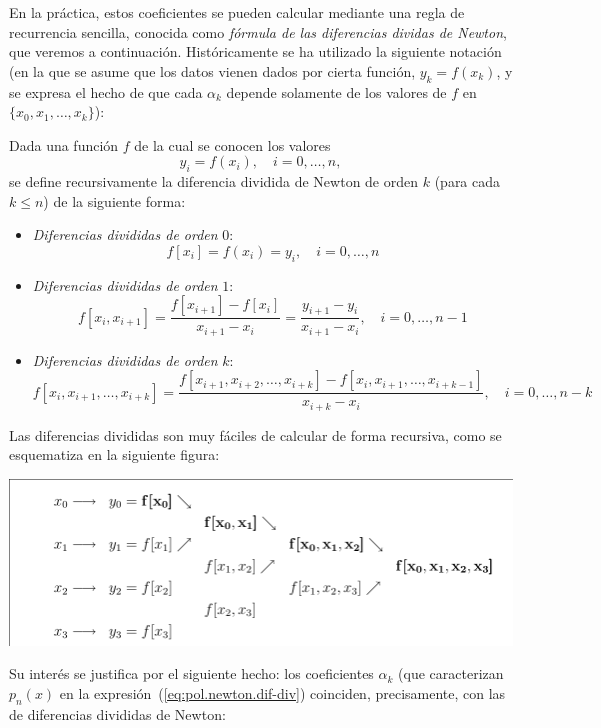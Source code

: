 En la práctica, estos coeficientes se pueden calcular mediante una
regla de recurrencia sencilla, conocida como \textit{fórmula de las
  diferencias dividas de Newton}, que veremos a continuación.
Históricamente se ha utilizado la siguiente notación (en la que se
asume que los datos vienen dados por cierta función, $y_k=f(x_k)$, y
se expresa el hecho de que cada $\alpha_k$ depende solamente de los
valores de $f$ en $\{x_0,x_1,\dots,x_k\}$):
\begin{definition}
  Dada una función $f$ de la cual se conocen los valores
  $$
  y_i=f(x_i), \quad i=0,\dots,n,
  $$
  se define recursivamente la diferencia dividida de Newton de orden
  $k$ (para cada $k\le n$) de la siguiente forma:
  \begin{itemize}
  \item \textit{Diferencias divididas de orden} $0$:
    $$
    f[x_i]=f(x_i)=y_i,    \quad i=0,\dots,n
    $$
  \item \textit{Diferencias divididas de orden} $1$:
    $$
    f[x_i,x_{i+1}]=\frac{f[x_{i+1}]-f[x_i]}{x_{i+1}-x_i}=\frac{y_{i+1}-y_i}{x_{i+1}-x_i},
    \quad i=0,\dots,n-1
    $$
  \item \textit{Diferencias divididas de orden} $k$:
    $$
    f[x_i,x_{i+1},\dots,x_{i+k}] =
    \frac{f[x_{i+1},x_{i+2},\dots,x_{i+k}]-f[x_i,x_{i+1},\dots,x_{i+k-1}]} {x_{i+k}-x_i},
    \quad i=0,\dots,n-{k}
    $$
  \end{itemize}
\end{definition}

Las diferencias divididas son muy fáciles de calcular de forma
recursiva, como se esquematiza en la siguiente figura:
\begin{center}
  \includegraphics[width=0.9\linewidth]{tema2/diferencias-div}
\end{center}

Su interés se justifica por el siguiente hecho: los coeficientes
$\alpha_k$ (que caracterizan $p_n(x)$ en la
expresión~(\ref{eq:pol.newton.dif-div}) coinciden, precisamente,  con las
de diferencias divididas de Newton:

